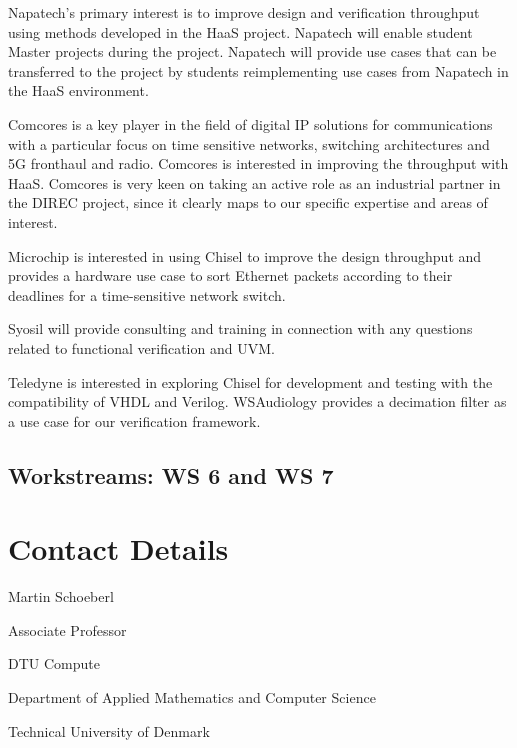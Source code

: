 \documentclass[fleqn,12pt]{article}
\begin{document}
Napatech's primary interest is to improve design and  verification throughput using methods developed in the HaaS project.
Napatech will enable student Master projects during the project.
Napatech will provide use cases that can be transferred to the project by students reimplementing use cases from Napatech in the HaaS environment.

Comcores is a key player in the field of digital IP solutions for communications with a particular focus on time sensitive networks, switching architectures and 5G fronthaul and radio.
Comcores is interested in improving the throughput with HaaS.
Comcores is very keen on taking an active role as an industrial partner in the DIREC project, since it clearly maps to our specific expertise and areas of interest.

Microchip is interested in using Chisel to improve the design throughput and
provides a hardware use case to sort Ethernet packets according to their deadlines
for a time-sensitive network switch.

Syosil will provide consulting and training in connection with any questions related
to functional verification and UVM.

Teledyne is interested in exploring Chisel for development and testing with the compatibility of VHDL and Verilog.
%
WSAudiology provides a decimation filter as a use case for our verification framework.
%


%


\subsection*{Workstreams: WS 6 and WS 7}


\section*{Contact Details}

Martin Schoeberl

\noindent Associate Professor

\bigskip

\noindent DTU Compute

\noindent Department of Applied Mathematics and Computer Science

\noindent Technical University of Denmark
\end{document}
